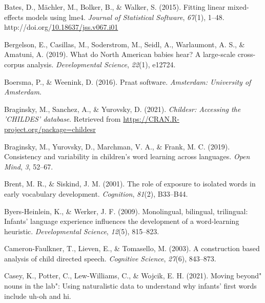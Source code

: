 \documentclass[10pt, letterpaper]{article}
\newenvironment{CSLReferences}%
  {}%
  {\par}
\begin{document}
\noindent

\hypertarget{refs}{}
\begin{CSLReferences}{1}{0}
\leavevmode\hypertarget{ref-bates2015fitting}{}%
Bates, D., Mächler, M., Bolker, B., \& Walker, S. (2015). Fitting linear
mixed-effects models using {lme4}. \emph{Journal of Statistical
Software}, \emph{67}(1), 1--48.
http://doi.org/\href{https://doi.org/10.18637/jss.v067.i01}{10.18637/jss.v067.i01}

\leavevmode\hypertarget{ref-bergelson2019north}{}%
Bergelson, E., Casillas, M., Soderstrom, M., Seidl, A., Warlaumont, A.
S., \& Amatuni, A. (2019). What do {North American} babies hear? A
large-scale cross-corpus analysis. \emph{Developmental Science},
\emph{22}(1), e12724.

\leavevmode\hypertarget{ref-boersma2016praat}{}%
Boersma, P., \& Weenink, D. (2016). Praat software. \emph{Amsterdam:
University of Amsterdam}.

\leavevmode\hypertarget{ref-braginsky2021childesr}{}%
Braginsky, M., Sanchez, A., \& Yurovsky, D. (2021). \emph{Childesr:
Accessing the 'CHILDES' database}. Retrieved from
\url{https://CRAN.R-project.org/package=childesr}

\leavevmode\hypertarget{ref-braginsky2019consistency}{}%
Braginsky, M., Yurovsky, D., Marchman, V. A., \& Frank, M. C. (2019).
Consistency and variability in children's word learning across
languages. \emph{Open Mind}, \emph{3}, 52--67.

\leavevmode\hypertarget{ref-brent2001role}{}%
Brent, M. R., \& Siskind, J. M. (2001). The role of exposure to isolated
words in early vocabulary development. \emph{Cognition}, \emph{81}(2),
B33--B44.

\leavevmode\hypertarget{ref-byers2009monolingual}{}%
Byers-Heinlein, K., \& Werker, J. F. (2009). Monolingual, bilingual,
trilingual: Infants' language experience influences the development of a
word-learning heuristic. \emph{Developmental Science}, \emph{12}(5),
815--823.

\leavevmode\hypertarget{ref-cameron2003construction}{}%
Cameron-Faulkner, T., Lieven, E., \& Tomasello, M. (2003). A
construction based analysis of child directed speech. \emph{Cognitive
Science}, \emph{27}(6), 843--873.

\leavevmode\hypertarget{ref-caseyURmoving}{}%
Casey, K., Potter, C., Lew-Williams, C., \& Wojcik, E. H. (2021). Moving
beyond" nouns in the lab": Using naturalistic data to understand why
infants' first words include uh-oh and hi.


\end{CSLReferences}
\end{document}
